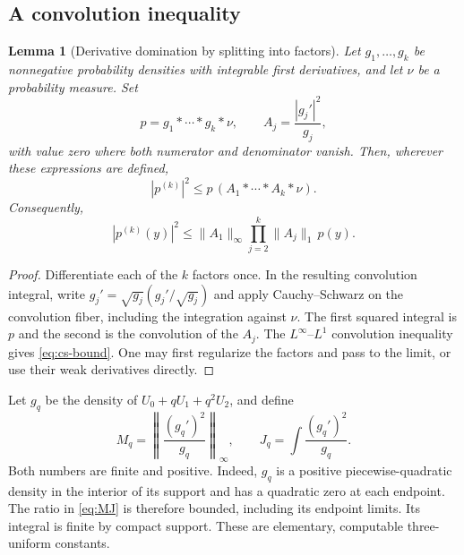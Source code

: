 \documentclass[11pt,a4paper]{article}
\numberwithin{equation}{section}
\newtheorem{lemma}[theorem]{Lemma}
\theoremstyle{definition}\newtheorem{definition}[theorem]{Definition}
\theoremstyle{remark}\newtheorem{remark}[theorem]{Remark}
\newcommand{\norm}[1]{\lVert #1\rVert}
\begin{document}
\subsection{A convolution inequality}
\begin{lemma}[Derivative domination by splitting into factors]
\label{lem:cs-convolution}
Let $g_1,\ldots,g_k$ be nonnegative probability densities with integrable first derivatives, and let $\nu$ be a probability measure. Set
\[
 p=g_1*\cdots*g_k*\nu,
 \qquad A_j=\frac{|g_j'|^2}{g_j},
\]
with value zero where both numerator and denominator vanish. Then, wherever these expressions are defined,
\begin{equation}
 |p^{(k)}|^2\le p\,(A_1*\cdots*A_k*\nu).
 \label{eq:cs-convolution}
\end{equation}
Consequently,
\begin{equation}
 |p^{(k)}(y)|^2\le
 \norm{A_1}_\infty\prod_{j=2}^k\norm{A_j}_1\,p(y).
 \label{eq:cs-bound}
\end{equation}
\end{lemma}
\begin{proof}
Differentiate each of the $k$ factors once. In the resulting convolution integral, write $g_j'=\sqrt{g_j}(g_j'/\sqrt{g_j})$ and apply Cauchy--Schwarz on the convolution fiber, including the integration against $\nu$. The first squared integral is $p$ and the second is the convolution of the $A_j$. The $L^\infty$--$L^1$ convolution inequality gives \eqref{eq:cs-bound}. One may first regularize the factors and pass to the limit, or use their weak derivatives directly.
\end{proof}

Let $g_q$ be the density of $U_0+qU_1+q^2U_2$, and define
\begin{equation}
 M_q=\left\lVert\frac{(g_q')^2}{g_q}\right\rVert_\infty,
 \qquad J_q=\int\frac{(g_q')^2}{g_q}.
 \label{eq:MJ}
\end{equation}
Both numbers are finite and positive. Indeed, $g_q$ is a positive piecewise-quadratic density in the interior of its support and has a quadratic zero at each endpoint. The ratio in \eqref{eq:MJ} is therefore bounded, including its endpoint limits. Its integral is finite by compact support. These are elementary, computable three-uniform constants.
\end{document}
